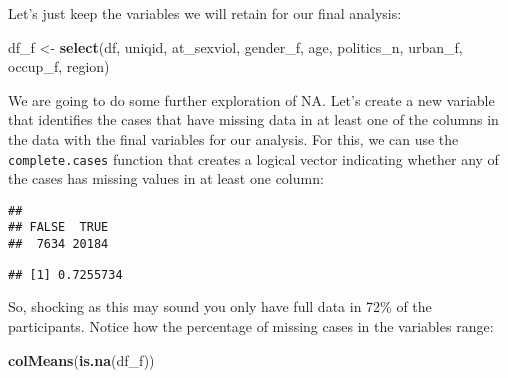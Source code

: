 \documentclass[
]{book}
\newenvironment{Shaded}{\begin{snugshade}}{\end{snugshade}}
\newcommand{\FunctionTok}[1]{\textcolor[rgb]{0.13,0.29,0.53}{\textbf{#1}}}
\newcommand{\NormalTok}[1]{#1}
\newcommand{\OtherTok}[1]{\textcolor[rgb]{0.56,0.35,0.01}{#1}}
\newcommand{\SpecialCharTok}[1]{\textcolor[rgb]{0.81,0.36,0.00}{\textbf{#1}}}
\begin{document}
Let's just keep the variables we will retain for our final analysis:

\begin{Shaded}
\begin{Highlighting}[]
\NormalTok{df\_f }\OtherTok{\textless{}{-}} \FunctionTok{select}\NormalTok{(df, uniqid, at\_sexviol, gender\_f, age, politics\_n,}
\NormalTok{               urban\_f, occup\_f, region)}
\end{Highlighting}
\end{Shaded}

We are going to do some further exploration of NA. Let's create a new variable that identifies the cases that have missing data in at least one of the columns in the data with the final variables for our analysis. For this, we can use the \texttt{complete.cases} function that creates a logical vector indicating whether any of the cases has missing values in at least one column:

\begin{Shaded}
\end{Shaded}

\begin{verbatim}
## 
## FALSE  TRUE 
##  7634 20184
\end{verbatim}

\begin{Shaded}
\end{Shaded}

\begin{verbatim}
## [1] 0.7255734
\end{verbatim}

So, shocking as this may sound you only have full data in 72\% of the participants. Notice how the percentage of missing cases in the variables range:

\begin{Shaded}
\begin{Highlighting}[]
\FunctionTok{colMeans}\NormalTok{(}\FunctionTok{is.na}\NormalTok{(df\_f))}
\end{Highlighting}
\end{Shaded}
\end{document}
